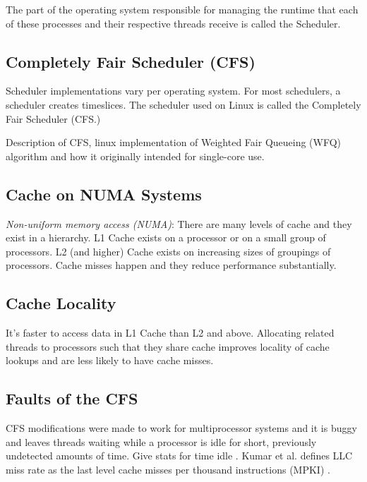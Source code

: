 \documentclass{sig-alternate}
\begin{document}
The part of the operating system responsible for managing the runtime that each of these processes and their respective threads receive is called the Scheduler.\cite{Lozi:2016}

\subsection{Completely Fair Scheduler (CFS)}
\label{sec:cfs}

Scheduler implementations vary per operating system. For most schedulers, a scheduler creates timeslices. The scheduler used on Linux is called the Completely Fair Scheduler (CFS.)  \cite{Lozi:2016}

Description of CFS, linux implementation of Weighted Fair Queueing (WFQ) algorithm and how it originally intended for single-core use. \cite{Lozi:2016}

\subsection{Cache on NUMA Systems}
\label{sec:cache}

\textit{Non-uniform memory access (NUMA)}:
There are many levels of cache and they exist in a hierarchy. L1 Cache exists on a processor or on a small group of processors. L2 (and higher) Cache exists on increasing sizes of groupings of processors.
Cache misses happen and they reduce performance substantially.

\subsection{Cache Locality}
\label{sec:cachelocality}

It's faster to access data in L1 Cache than L2 and above. Allocating related threads to processors such that they share cache improves locality of cache lookups and are less likely to have cache misses.

\subsection{Faults of the CFS}
\label{sec:cfsfaults}

CFS modifications were made to work for multiprocessor systems and it is buggy and leaves threads waiting while a processor is idle for short, previously undetected amounts of time. Give stats for time idle \cite{Lozi:2016}. Kumar et al. defines LLC miss rate as the last level cache misses per thousand instructions (MPKI) \cite{KumarEtal:2014}.
\end{document}
